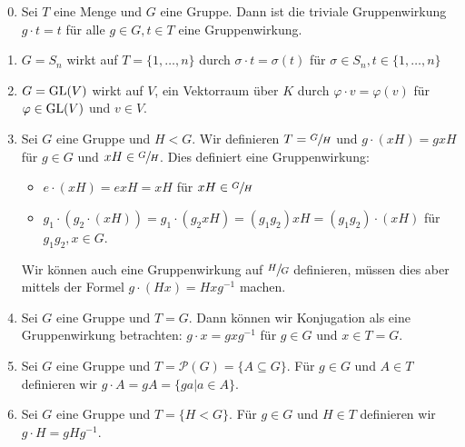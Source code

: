 \begin{eg}
	\begin{enumerate}[1)]
		\setcounter{enumi}{-1}
		\item Sei $T$ eine Menge und $G$ eine Gruppe. Dann ist die triviale Gruppenwirkung $g \cdot t = t$ für alle $g \in G, t \in T$ eine Gruppenwirkung.
		\item $G = S_{n}$ wirkt auf $T = \{1,\ldots,n\} $ durch $\sigma \cdot t = \sigma(t)$ für $\sigma \in S_{n}, t \in \{1,\ldots,n\} $ 
		\item $G = \operatorname{GL}(V)$ wirkt auf $V$, ein Vektorraum über  $K$ durch
			$\varphi \cdot v = \varphi(v)$ für $\varphi \in \operatorname{GL}(V)$ und $v \in V$.
		\item Sei $G$ eine Gruppe und $H < G$. Wir definieren $T =  \sfrac{G}{H}$ und $g \cdot (xH) = gxH$ für $g \in G$ und $xH \in \sfrac{G}{H}$.
			Dies definiert eine Gruppenwirkung: 
			 \begin{itemize}
				 \item $e \cdot (xH) = e x H = x H$ für $x H \in \sfrac{G}{H}$ 
				 \item $g_1 \cdot (g_2 \cdot (xH)) = g_1 \cdot (g_2 x H) = (g_1 g_2) x H = (g_1 g_2) \cdot (xH)$ für $g_1 g_2, x \in G$.
			\end{itemize}
			\begin{attention}
				Wir können auch eine Gruppenwirkung auf $\sfrac{H}{G}$ definieren,
				müssen dies aber mittels der Formel $g \cdot (Hx) = H x g^{-1}$ machen.
			\end{attention}
		\item Sei $G$ eine Gruppe und $T = G$. Dann können wir Konjugation als eine Gruppenwirkung betrachten:
			$g \cdot x = g x g^{-1}$ für $g \in G$ und $x \in T = G$.
		\item Sei $G$ eine Gruppe und $T = \mathcal{P}(G) = \{A \subseteq G\} $. Für $g \in G$ und $A \in T$ definieren wir
			$g \cdot A = g A = \{g a | a \in A\} $.
		\item Sei $G$ eine Gruppe und $T = \{H < G\} $. Für $g \in G$ und $H \in T$ definieren wir
			$g \cdot H = g H g^{-1}$.
	\end{enumerate}
\end{eg}

